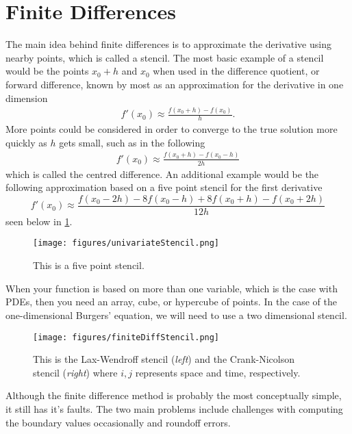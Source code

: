 \documentclass[undefended]{sfuthesis}
\begin{document}
\section{Finite Differences}

The main idea behind finite differences is to approximate the derivative using nearby points, which is called a stencil. The most basic example of a stencil would be the points $x_0 + h$ and $x_0$ when used in the difference quotient, or forward difference, known by most as an approximation for the derivative in one dimension
\begin{align}
f'(x_0) \approx \frac{f(x_0 + h) - f(x_0)}{h}. \label{diffQuotient}
\end{align}
More points could be considered in order to converge to the true solution more quickly as $h$ gets small, such as in the following
\begin{align}
	f'(x_0) \approx \frac{f(x_0 + h) - f(x_0 - h)}{2h} \label{CenteredDifference}
\end{align}
which is called the centred difference. An additional example would be the following approximation based on a five point stencil for the first derivative \[f'(x_0) \approx \frac{f(x_0 - 2h) - 8f(x_0 - h) + 8f(x_0 + h) - f(x_0 + 2h)}{12h}\] seen below in \ref{fig:univariateStencil}. 
\begin{figure}[h!]
	\centering
	\texttt{[image: figures/univariateStencil.png]}
	\caption{This is a five point stencil.}
	\label{fig:univariateStencil}
\end{figure}

When your function is based on more than one variable, which is the case with PDEs, then you need an array, cube, or hypercube of points. In the case of the one-dimensional Burgers' equation, we will need to use a two dimensional stencil.
\begin{figure}[h!]
	\centering
	\texttt{[image: figures/finiteDiffStencil.png]}
	\caption{This is the Lax-Wendroff stencil (\textit{left}) and the Crank-Nicolson stencil (\textit{right}) where $i, j$ represents space and time, respectively.}
	\label{fig:Stecil}
\end{figure}

Although the finite difference method is probably the most conceptually simple, it still has it's faults. The two main problems include challenges with computing the boundary values occasionally and roundoff errors. 
\end{document}
